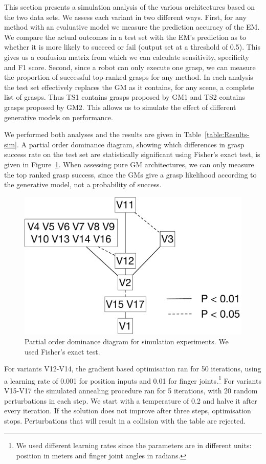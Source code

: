 This section presents a simulation analysis of the various architectures based on the two data sets. 
We assess each variant in two different ways. First, for any method with an evaluative model we  measure the prediction accuracy of the EM. We compare the actual outcomes in a test set with the EM's prediction as to whether it is more likely to succeed or fail (output set at a threshold of 0.5). This gives us a confusion matrix from which we can calculate sensitivity, specificity and F1 score. Second, since a robot can only execute one grasp, we can measure the proportion of successful top-ranked grasps for any method. In each analysis the test set effectively replaces the GM as it contains, for any scene, a complete list of grasps. Thus TS1 contains grasps proposed by GM1 and TS2 contains grasps proposed by GM2. This allows us to simulate the effect of different generative models on performance.

We performed both analyses and the results are given in Table~\ref{table:Results-sim}. A partial order dominance diagram, showing which differences in grasp success rate on the test set are statistically significant using Fisher's exact test, is given in Figure~\ref{fig:dominance}. When assessing pure GM architectures, we can only measure the top ranked grasp success, since the GMs give a grasp likelihood according to the generative model, not a probability of success.

\begin{figure}
\centering
\includegraphics[width=0.8\columnwidth]{images/dominance}
\caption{Partial order dominance diagram for simulation experiments. We used Fisher's exact test.}
\label{fig:dominance}
\end{figure}

For variants V12-V14, the gradient based optimisation ran for 50 iterations, using a learning rate of 0.001 for position inputs and 0.01 for finger joints.\footnote{We used different learning rates since the parameters are in different units: position in meters and finger joint angles in radians.} For variants V15-V17 the simulated annealing procedure ran for 5 iterations, with 20 random perturbations in each step. We start with a temperature of 0.2 and halve it after every iteration. If the solution does not improve after three steps, optimisation stops. Perturbations that will result in a collision with the table are rejected.

